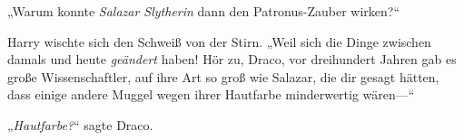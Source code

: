 „Warum konnte \emph{Salazar Slytherin} dann den Patronus-Zauber wirken?“

Harry wischte sich den Schweiß von der Stirn. „Weil sich die Dinge zwischen damals und heute \emph{geändert} haben! Hör zu, Draco, vor dreihundert Jahren gab es große Wissenschaftler, auf ihre Art so groß wie Salazar, die dir gesagt hätten, dass einige andere Muggel wegen ihrer Hautfarbe minderwertig wären—“

„\emph{Hautfarbe?}“ sagte Draco.

